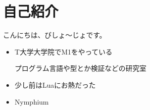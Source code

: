 \section{自己紹介}
\begin{frame}
    \frametitlesec

    \vfill

    \begin{minipage}[b]{.1\textwidth}
        \centering
    \end{minipage}
    \begin{minipage}[b]{.49\textwidth}
        こんにちは、びしょ〜じょです。
    \end{minipage}

    \begin{itemize}
        \item T大学大学院でM1をやっている

            プログラム言語や型とか検証などの研究室
        \item 少し前はLuaにお熱だった

        \item[\textcolor{gray}{\faicon{paperclip}}] {\small \href{https://twitter.com/Nymphium}{\textcolor{blue!60!white}{}} \href{https://github.com/Nymphium}{\textcolor{black}{}} Nymphium}
    \end{itemize}

    \vfill
\end{frame}

